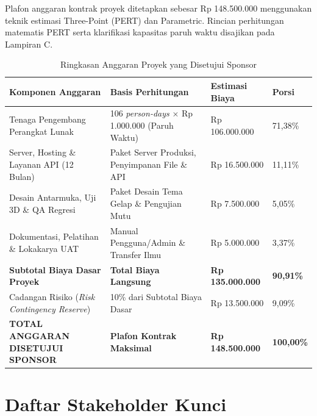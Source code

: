 \documentclass[11pt,a4paper]{article}
\newcommand{\thdr}[1]{\centering\arraybackslash\textbf{#1}}
\renewcommand{\arraystretch}{1.26}
\begin{document}
Plafon anggaran kontrak proyek ditetapkan sebesar Rp 148.500.000 menggunakan teknik estimasi Three-Point (PERT) dan Parametric. Rincian perhitungan matematis PERT serta klarifikasi kapasitas paruh waktu disajikan pada Lampiran C.

\vspace{-4pt}
\begin{table}[H]
\centering
{\renewcommand{\arraystretch}{1.12}\small
\caption{Ringkasan Anggaran Proyek yang Disetujui Sponsor}
\begin{tabularx}{\textwidth}{| L{5.4cm} | Y | R{3.3cm} | C{1.5cm} |}
\hline
{} \thdr{Komponen Anggaran} & \thdr{Basis Perhitungan} & \thdr{Estimasi Biaya} & \thdr{Porsi} \\
\hline
Tenaga Pengembang Perangkat Lunak & 106 \textit{person-days} $\times$ Rp 1.000.000 (Paruh Waktu) & Rp 106.000.000 & 71,38\% \\
\hline
Server, Hosting \& Layanan API (12 Bulan) & Paket Server Produksi, Penyimpanan File \& API & Rp 16.500.000 & 11,11\% \\
\hline
Desain Antarmuka, Uji 3D \& QA Regresi & Paket Desain Tema Gelap \& Pengujian Mutu & Rp 7.500.000 & 5,05\% \\
\hline
Dokumentasi, Pelatihan \& Lokakarya UAT & Manual Pengguna/Admin \& Transfer Ilmu & Rp 5.000.000 & 3,37\% \\
\hline
{} \textbf{Subtotal Biaya Dasar Proyek} & \textbf{Total Biaya Langsung} & \textbf{Rp 135.000.000} & \textbf{90,91\%} \\
\hline
Cadangan Risiko (\textit{Risk Contingency Reserve}) & 10\% dari Subtotal Biaya Dasar & Rp 13.500.000 & 9,09\% \\
\hline
{} \textbf{TOTAL ANGGARAN DISETUJUI SPONSOR} & \textbf{Plafon Kontrak Maksimal} & \textbf{Rp 148.500.000} & \textbf{100,00\%} \\
\hline
\end{tabularx}}
\end{table}

\vspace{-4pt}
\section{Daftar Stakeholder Kunci}
\end{document}
